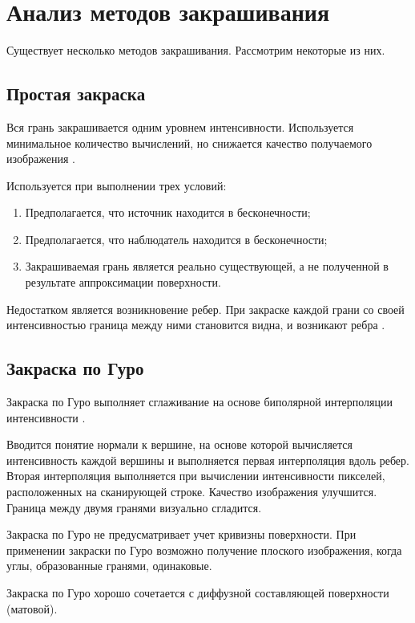 \section{Анализ методов закрашивания}

Существует несколько методов закрашивания. Рассмотрим некоторые из них.

\subsection{Простая закраска}

Вся грань закрашивается одним уровнем интенсивности. Используется минимальное количество вычислений, но снижается качество получаемого изображения \cite{fill}.

Используется при выполнении трех условий:
\begin{enumerate}
	\item Предполагается, что источник находится в бесконечности;
	\item Предполагается, что наблюдатель находится в бесконечности;
	\item Закрашиваемая грань является реально существующей, а не полученной в результате аппроксимации поверхности.
\end{enumerate}

Недостатком является возникновение ребер. При закраске каждой грани со своей интенсивностью граница между ними становится видна, и возникают ребра \cite{simplefill}.

\subsection{Закраска по Гуро}

Закраска по Гуро выполняет сглаживание на основе биполярной интерполяции интенсивности \cite{algFill}.

Вводится понятие нормали к вершине, на основе которой вычисляется интенсивность каждой вершины и выполняется первая интерполяция вдоль ребер. Вторая интерполяция выполняется при вычислении интенсивности пикселей, расположенных на сканирующей строке. Качество изображения улучшится. Граница между двумя гранями визуально сгладится.

Закраска по Гуро не предусматривает учет кривизны поверхности. При применении закраски по Гуро возможно получение плоского изображения, когда углы, образованные гранями, одинаковые.

Закраска по Гуро хорошо сочетается с диффузной составляющей поверхности (матовой).

